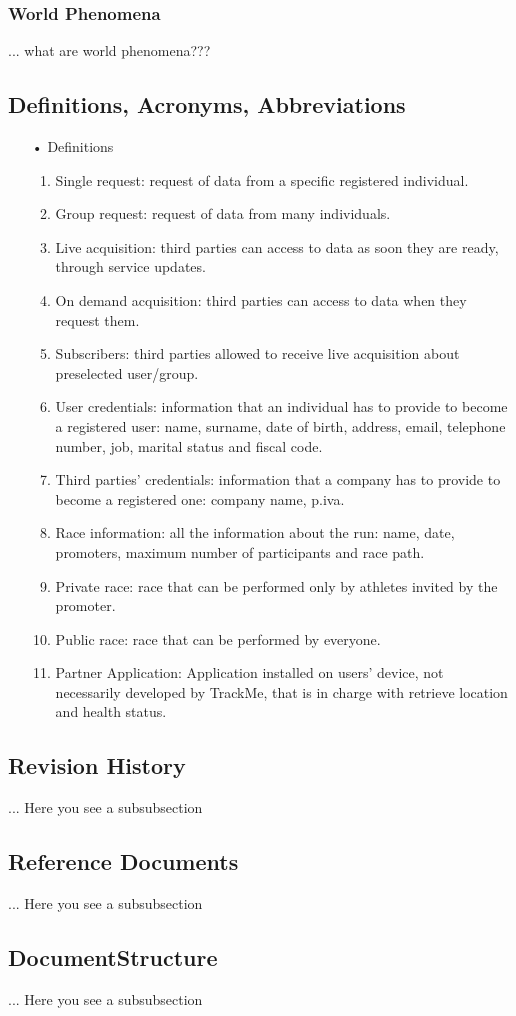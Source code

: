 \subsubsection{World Phenomena}
... what are world phenomena???

\subsection{Definitions, Acronyms, Abbreviations}

\begin{enumerate}
\item[•] {\Large Definitions}
	\begin{enumerate}
		\item Single request: request of data from a specific registered individual.
		\item Group request: request of data from many individuals. 
		\item Live acquisition: third parties can access to data as soon they are ready, 				through service updates.
		\item On demand acquisition: third parties can access to data when they request 				them.
		\item Subscribers: third parties allowed to receive live acquisition about 						preselected	user/group.
		\item User credentials: information that an individual has to provide to become a 				registered user: name, surname, date of birth, address, email, telephone
			number, job, marital status and fiscal code. 
		\item Third parties' credentials: information that a company has to provide to 					become a registered one: company name, p.iva.
		\item Race information: all the information about the run: name, date, promoters, 				maximum number of participants and race path.
		\item Private race: race that can be performed only by athletes invited by the promoter.
		\item Public race: race that can be performed by everyone.
		\item Partner Application: Application installed on users' device, not necessarily developed by TrackMe, that is in charge with retrieve location and health status.
	\end{enumerate}
\end{enumerate}
	
\subsection{Revision History}
... Here you see a subsubsection
\subsection{Reference Documents}
... Here you see a subsubsection
\subsection{DocumentStructure}
... Here you see a subsubsection

